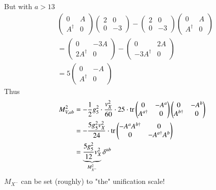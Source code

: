 But with $a>13$
\begin{align*}
   &\begin{pmatrix} 0 & A \\ A^\dagger & 0\end{pmatrix} 
   \begin{pmatrix} 2 & 0 \\ 0 & -3 \end{pmatrix} 
   -
   \begin{pmatrix} 2 & 0 \\ 0 & -3\end{pmatrix}
   \begin{pmatrix} 0 & A \\ A^\dagger & 0 \end{pmatrix}  \\
   &= \begin{pmatrix} 0 & -3A \\ 2A^\dagger & 0\end{pmatrix} 
   - 
   \begin{pmatrix} 0 & 2A \\ -3A^\dagger & 0 \end{pmatrix} \\
   &= 5 \begin{pmatrix} 0 & -A \\ A^\dagger & 0 \end{pmatrix}
\end{align*}
Thus
\begin{align}
   M^2_{V, ab} &= -\frac{1}{2} g_5^2 \cdot \frac{v_X^2}{60} \cdot 25 \cdot \tr
   \begin{pmatrix} 0 & -A^a \\ A^{a\dagger} & 0 \end{pmatrix} 
   \begin{pmatrix} 0 & -A^b \\ A^{b\dagger} & 0 \end{pmatrix} \notag \\
   &= - \frac{5g_5^2 v_X^2}{24} \cdot \tr \begin{pmatrix} -A^a A^{b\dagger} & 0 \\ 0 & -A^{a\dagger}A^b \end{pmatrix}    \notag \\
   &= \underbrace{\frac{5g_5^2}{12} v_X^2}_{M^2_{X^-}} \delta^{ab} \label{2.38}
\end{align}
$M_{X^-}$ can be set (roughly) to "the" unification scale! 

